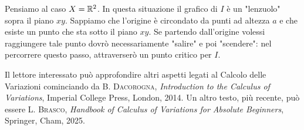 \begin{osservazione}
	Pensiamo al caso $X = \mathbb{R}^2$. In questa situazione il grafico di $I$ è un "lenzuolo" sopra il piano $xy$. Sappiamo che l'origine è circondato da punti ad altezza $a$ e che esiste un punto che sta sotto il piano $xy$. Se partendo dall'origine volessi raggiungere tale punto dovrò necessariamente "salire" e poi "scendere": nel percorrere questo passo, attraverserò un punto critico per $I$.
\end{osservazione}


Il lettore interessato può approfondire altri aspetti legati al Calcolo delle Variazioni cominciando da
\textsc{B. Dacorogna}, \emph{Introduction to the Calculus of Variations}, Imperial College Press, London, 2014. Un altro testo, più recente, può essere \textsc{L. Brasco}, \emph{Handbook of Calculus of Variations for Absolute Beginners}, Springer, Cham, 2025.